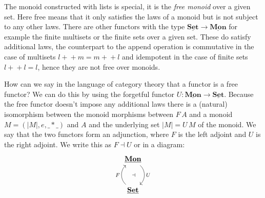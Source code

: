 \documentclass{article}
\newcommand{\Set}{\mathbf{Set}}
\newcommand{\cat}[1]{\underline{\mathbf{#1}}}
\newcommand{\app}{+\!\!+}
\begin{document}
The monoid constructed with lists is special, it is the \emph{free monoid} over a given set. Here free means that it only satisfies the laws of a monoid but is not subject to any other laws. There are other functors with the type $\cat{\Set} \to \cat{Mon}$ for example the finite multisets or the finite sets over a given set. These do satisfy additional laws, the counterpart to the append operation is commutative in the case of multisets $l \app m = m \app l$ and idempotent in the case of finite sets $l \app l = l$, hence they are not free over monoids.

How can we say in the language of category theory that a functor is a free functor? We can do this by using the forgetful functor $U: \cat{Mon} \to \cat{Set}$. Because the free functor doesn't impose any additional laws there is a (natural) isomorphism between the monoid morphisms between $F\,A$ and a monoid $M = (|M|,e,\_*\_)$ and $A$ and the underlying set $|M| = U\,M$
of the monoid. We say that the two functors form an adjunction, where $F$ is the left adjoint and $U$ is the right adjoint. We write this as $F \dashv U$ or in a diagram:
\[\begin{tikzcd}[row sep=large]
\cat{Mon} \arrow[d,bend left = 50,"U" right,"\dashv" left = 10] \\ 
\cat{Set} \arrow[u,bend left = 50,"F" left, ]
\end{tikzcd}\]
\end{document}
